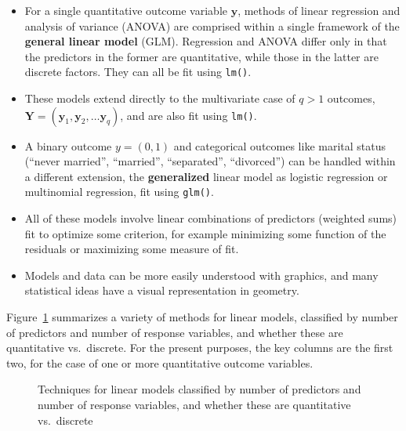 \documentclass[
  letterpaper,
  10pt,
  krantz2]{krantz}
\begin{document}
\begin{itemize}
\item
  For a single quantitative outcome variable \(\mathbf{y}\), methods of
  linear regression and analysis of variance (ANOVA) are comprised
  within a single framework of the \textbf{general linear model} (GLM).
  Regression and ANOVA differ only in that the predictors in the former
  are quantitative, while those in the latter are discrete factors. They
  can all be fit using \texttt{lm()}.
\item
  These models extend directly to the multivariate case of \(q > 1\)
  outcomes,
  \(\mathbf{Y} = (\mathbf{y}_1, \mathbf{y}_2, \dots \mathbf{y}_q)\), and
  are also fit using \texttt{lm()}.
\item
  A binary outcome \(y = (0, 1)\) and categorical outcomes like marital
  status (``never married'', ``married'', ``separated'', ``divorced'')
  can be handled within a different extension, the \textbf{generalized}
  linear model as logistic regression or multinomial regression, fit
  using \texttt{glm()}.
\item
  All of these models involve linear combinations of predictors
  (weighted sums) fit to optimize some criterion, for example minimizing
  some function of the residuals or maximizing some measure of fit.
\item
  Models and data can be more easily understood with graphics, and many
  statistical ideas have a visual representation in geometry.
\end{itemize}

Figure~\ref{fig-techniques} summarizes a variety of methods for linear
models, classified by number of predictors and number of response
variables, and whether these are quantitative vs.~discrete. For the
present purposes, the key columns are the first two, for the case of one
or more quantitative outcome variables.

\begin{figure}


\caption{\label{fig-techniques}Techniques for linear models classified
by number of predictors and number of response variables, and whether
these are quantitative vs.~discrete}

\end{figure}%
\end{document}
